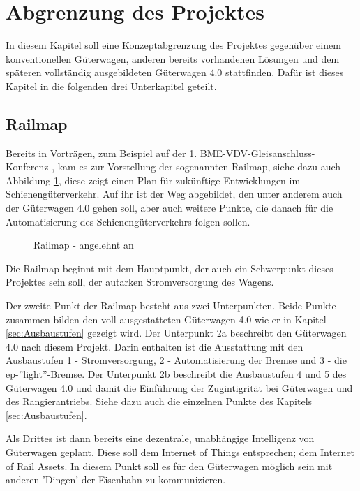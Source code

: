 \section{Abgrenzung des Projektes}
In diesem Kapitel soll eine Konzeptabgrenzung des Projektes gegenüber einem konventionellen Güterwagen, anderen bereits vorhandenen Lösungen und dem späteren vollständig ausgebildeten Güterwagen 4.0 stattfinden. Dafür ist dieses Kapitel in die folgenden drei Unterkapitel geteilt.

\subsection{Railmap}
Bereits in Vorträgen, zum Beispiel auf der 1. BME-VDV-Gleisanschluss-Konferenz \cite{GAK}, kam es zur Vorstellung der sogenannten Railmap, siehe dazu auch Abbildung \ref{fig:Railmap}, diese zeigt einen Plan für zukünftige Entwicklungen im Schienengüterverkehr. Auf ihr ist der Weg abgebildet, den unter anderem auch der Güterwagen 4.0  gehen soll, aber auch weitere Punkte, die danach für die Automatisierung des Schienengüterverkehrs folgen sollen.\par
\begin{figure}[hbp]
    \centering
    
    \caption{Railmap - angelehnt an \cite{GAK}}
    \label{fig:Railmap}
\end{figure}
Die Railmap beginnt mit dem Hauptpunkt, der auch ein Schwerpunkt dieses Projektes sein soll, der autarken Stromversorgung des Wagens. \par
Der zweite Punkt der Railmap besteht aus zwei Unterpunkten. Beide Punkte zusammen bilden den voll ausgestatteten Güterwagen 4.0 wie er in Kapitel \ref{sec:Ausbaustufen} gezeigt wird. %
Der Unterpunkt 2a beschreibt den Güterwagen 4.0 nach diesem Projekt. Darin enthalten ist die Ausstattung mit den Ausbaustufen 1 - Stromversorgung, 2 - Automatisierung der Bremse und 3 - die ep-''light''-Bremse. %
Der Unterpunkt 2b beschreibt die Ausbaustufen 4 und 5 des Güterwagen 4.0 und damit die Einführung der Zugintigrität bei Güterwagen und des Rangierantriebs. Siehe dazu auch die einzelnen Punkte des Kapitels \ref{sec:Ausbaustufen}.\par
Als Drittes ist dann bereits eine dezentrale, unabhängige Intelligenz von Güterwagen geplant. Diese soll dem Internet of Things entsprechen; dem Internet of Rail Assets. In diesem Punkt soll es für den Güterwagen möglich sein mit anderen 'Dingen' der Eisenbahn zu kommunizieren.\par
